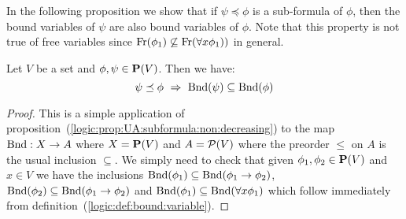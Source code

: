 In the following proposition we show that if $\psi\preceq\phi$ is a
sub-formula of $\phi$, then the bound variables of $\psi$ are also
bound variables of $\phi$. Note that this property is not true of
free variables since $\mbox{\rm Fr}(\phi_{1})\not\subseteq\mbox{\rm Fr}(\forall
x\phi_{1}))$ in general.

\begin{prop}\label{logic:prop:FOBL:boundvar:subformula}
Let $V$ be a set and $\phi,\psi\in\mbox{${\bf P}(V)$}$. Then we have:
    \[
    \psi\preceq\phi\ \Rightarrow\ \bound(\psi)\subseteq\bound(\phi)
    \]
\end{prop}
\begin{proof}
This is a simple application of
proposition~(\ref{logic:prop:UA:subformula:non:decreasing}) to the
map $\mbox{\rm Bnd}:X\to A$ where $X=\mbox{${\bf P}(V)$}$ and $A={\cal P}(V)$ where the
preorder $\leq$ on $A$ is the usual inclusion $\subseteq$. We simply
need to check that given $\phi_{1},\phi_{2}\in\mbox{${\bf P}(V)$}$ and $x\in V$ we
have the inclusions
$\mbox{\rm Bnd}(\phi_{1})\subseteq\mbox{\rm Bnd}(\phi_{1}\to\phi_{2})$,
$\mbox{\rm Bnd}(\phi_{2})\subseteq\mbox{\rm Bnd}(\phi_{1}\to\phi_{2})$ and
$\mbox{\rm Bnd}(\phi_{1})\subseteq\mbox{\rm Bnd}(\forall x\phi_{1})$ which follow
immediately from definition~(\ref{logic:def:bound:variable}).
\end{proof}

